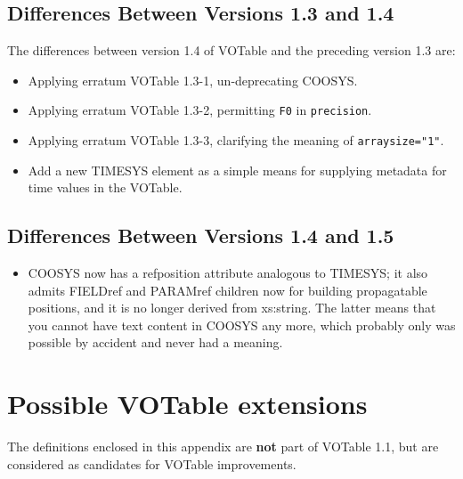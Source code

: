 \documentclass[11pt,a4paper]{ivoa}
\let\fg=\color
\def\attr#1{{\tt{\fg{DarkRed}#1}}}
\def\attrval#1#2{{\tt{\fg{DarkRed}#1}="{\fg{DarkPurple}#2}"}}
\begin{document}
{{{\subsection{Differences Between Versions 1.3 and 1.4}
\label{diff1.3-1.4}
The differences between version 1.4 of VOTable and the preceding
version 1.3 are:

\begin{itemize}
\item Applying erratum VOTable 1.3-1, un-deprecating COOSYS.
\item Applying erratum VOTable 1.3-2, permitting \verb|F0| in
\attr{precision}.
\item Applying erratum VOTable 1.3-3, clarifying the meaning of
\attrval{arraysize}{1}.
\item Add a new TIMESYS element as a simple means for
     supplying metadata for time values in the VOTable.
\end{itemize}


\subsection{Differences Between Versions 1.4 and 1.5}
\label{diff1.4-1.5}

\begin{itemize}
\item COOSYS now has a refposition attribute analogous to TIMESYS; it
also admits FIELDref and PARAMref children now for building propagatable
positions, and it is no longer derived from xs:string.  The latter means
that you cannot have text content in COOSYS any more, which probably
only was possible by accident and never had a meaning.
\end{itemize}





\clearpage
\appendix
{}

\bigskip

\section{Possible VOTable extensions}
The definitions enclosed in this appendix
are {\bf not} part of VOTable 1.1, but are considered as candidates
for VOTable improvements.


}}}
\end{document}
